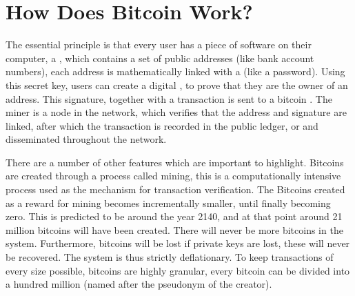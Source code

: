 
\chapter{How Does Bitcoin Work?}

The essential principle is that every user has a piece of software
on their computer, a\textbf{ }, which contains
a set of public addresses (like bank account numbers), each address
is mathematically linked with a \textbf{}
(like a password). Using this secret key, users can create a digital
, to prove that they are the owner of
an address. This signature, together with a transaction is sent to
a bitcoin \textbf{}. The miner is a node in
the network, which verifies that the address and signature are linked,
after which the transaction is recorded in the public ledger, or \textbf{}
and disseminated throughout the network.

There are a number of other features which are important to highlight.
Bitcoins are created through a process called mining, this is a computationally
intensive process used as the mechanism for transaction verification.
The Bitcoins created as a reward for mining becomes incrementally
smaller, until finally becoming zero. This is predicted to be around
the year 2140, and at that point around 21 million bitcoins will have
been created. There will never be more bitcoins in the system. Furthermore,
bitcoins will be lost if private keys are lost, these will never be
recovered. The system is thus strictly deflationary. To keep transactions
of every size possible, bitcoins are highly granular, every bitcoin
can be divided into a hundred million \textbf{}
(named after the pseudonym of the creator).
